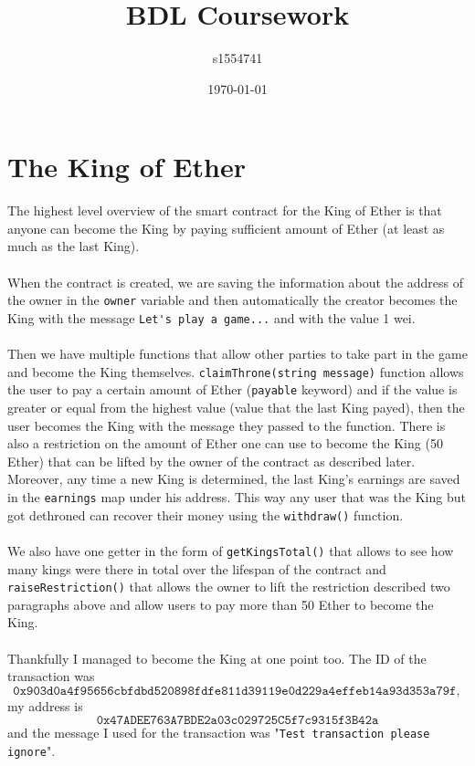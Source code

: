 \documentclass{article}
\title{BDL Coursework}
\author{s1554741}
\date{\today}
\begin{document}
    \maketitle

    \section{The King of Ether}
    The highest level overview of the smart contract for the
    King of Ether is that anyone can become the King by
    paying sufficient amount of Ether (at least as much as
    the last King).
    \\ \\
    When the contract is created, we are saving the
    information about the address of the owner in the
    \verb|owner| variable and then automatically the creator
    becomes the King with the message \verb|Let's play a game...| 
    and with the value 1 wei.
    \\ \\
    Then we have multiple functions that allow other parties
    to take part in the game and become the King themselves.
    \verb|claimThrone(string message)| function allows the
    user to pay a certain amount of Ether (\verb|payable|
    keyword) and if the value is greater or equal from the
    highest value (value that the last King payed), then the
    user becomes the King with the message they passed to
    the function. There is also a restriction on the amount
    of Ether one can use to become the King (50 Ether) that
    can be lifted by the owner of the contract as described
    later. Moreover, any time a new King is determined, the
    last King's earnings are saved in the \verb|earnings|
    map under his address. This way any user that was the
    King but got dethroned can recover their money using the
    \verb|withdraw()| function. 
    \\ \\
    We also have one getter in the form of
    \verb|getKingsTotal()| that allows to see how many kings
    were there in total over the lifespan of the contract
    and \verb|raiseRestriction()| that allows the owner to
    lift the restriction described two paragraphs above and
    allow users to pay more than 50 Ether to become the
    King.
    \\ \\
    Thankfully I managed to become the King at one point
    too. The ID of the transaction was 
    \[
        \texttt{0x903d0a4f95656cbfdbd520898fdfe811d39119e0d229a4effeb14a93d353a79f},
    \]
    my address is
    \[
        \texttt{0x47ADEE763A7BDE2a03c029725C5f7c9315f3B42a}
    \]
    and the message I used for the transaction was
    "\verb|Test transaction please ignore|".
\end{document}
